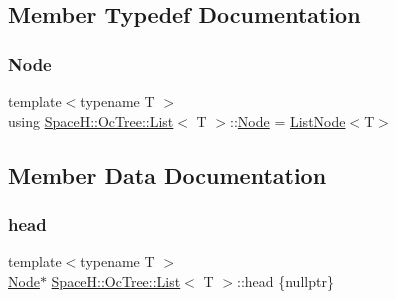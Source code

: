 \subsection{Member Typedef Documentation}
\mbox{\label{struct_space_h_1_1_oc_tree_1_1_list_ae787f0bcf88c840b7a5da72d48fe5041}} 
\subsubsection{\texorpdfstring{Node}{Node}}
{\footnotesize\ttfamily template$<$typename T $>$ \\
using \mbox{\hyperlink{struct_space_h_1_1_oc_tree_1_1_list}{Space\+H\+::\+Oc\+Tree\+::\+List}}$<$ T $>$\+::\mbox{\hyperlink{struct_space_h_1_1_oc_tree_1_1_list_ae787f0bcf88c840b7a5da72d48fe5041}{Node}} =  \mbox{\hyperlink{struct_space_h_1_1_oc_tree_1_1_list_node}{List\+Node}}$<$T$>$}



\subsection{Member Data Documentation}
\mbox{\label{struct_space_h_1_1_oc_tree_1_1_list_af74d1aa423831edea1feba9363e4dc6a}} 
\subsubsection{\texorpdfstring{head}{head}}
{\footnotesize\ttfamily template$<$typename T $>$ \\
\mbox{\hyperlink{struct_space_h_1_1_oc_tree_1_1_list_ae787f0bcf88c840b7a5da72d48fe5041}{Node}}$\ast$ \mbox{\hyperlink{struct_space_h_1_1_oc_tree_1_1_list}{Space\+H\+::\+Oc\+Tree\+::\+List}}$<$ T $>$\+::head \{nullptr\}}

\mbox{\label{struct_space_h_1_1_oc_tree_1_1_list_aa385a8c05f2e0ff920ae5aff8985ba59}} 
